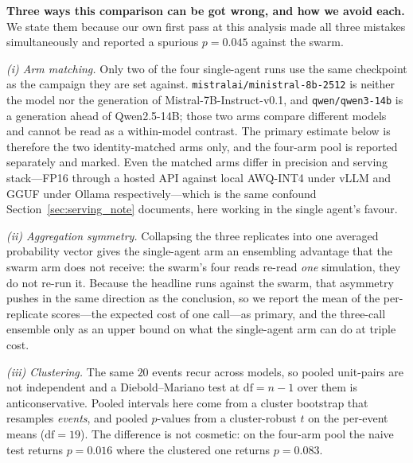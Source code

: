 \documentclass[11pt,journal,onecolumn]{IEEEtran}
\begin{document}
\textbf{Three ways this comparison can be got wrong, and how we avoid each.} We state them because our own first pass at this analysis made all three mistakes simultaneously and reported a spurious $p = 0.045$ against the swarm.

\emph{(i) Arm matching.} Only two of the four single-agent runs use the same checkpoint as the campaign they are set against. \texttt{mistralai/ministral-8b-2512} is neither the model nor the generation of Mistral-7B-Instruct-v0.1, and \texttt{qwen/qwen3-14b} is a generation ahead of Qwen2.5-14B; those two arms compare different models and cannot be read as a within-model contrast. The primary estimate below is therefore the two identity-matched arms only, and the four-arm pool is reported separately and marked. Even the matched arms differ in precision and serving stack---FP16 through a hosted API against local AWQ-INT4 under vLLM and GGUF under Ollama respectively---which is the same confound Section~\ref{sec:serving_note} documents, here working in the single agent's favour.

\emph{(ii) Aggregation symmetry.} Collapsing the three replicates into one averaged probability vector gives the single-agent arm an ensembling advantage that the swarm arm does not receive: the swarm's four reads re-read \emph{one} simulation, they do not re-run it. Because the headline runs against the swarm, that asymmetry pushes in the same direction as the conclusion, so we report the mean of the per-replicate scores---the expected cost of one call---as primary, and the three-call ensemble only as an upper bound on what the single-agent arm can do at triple cost.

\emph{(iii) Clustering.} The same $20$ events recur across models, so pooled unit-pairs are not independent and a Diebold--Mariano test at $\mathrm{df}=n-1$ over them is anticonservative. Pooled intervals here come from a cluster bootstrap that resamples \emph{events}, and pooled $p$-values from a cluster-robust $t$ on the per-event means ($\mathrm{df}=19$). The difference is not cosmetic: on the four-arm pool the naive test returns $p = 0.016$ where the clustered one returns $p = 0.083$.
\end{document}
